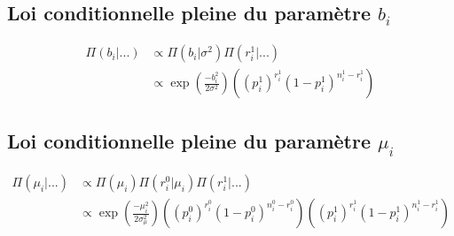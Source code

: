 \documentclass[
]{article}
\begin{document}
\hypertarget{loi-conditionnelle-pleine-du-paramuxe8tre-b_i}{%
\subsection{\texorpdfstring{Loi conditionnelle pleine du paramètre
\(b_i\)}{Loi conditionnelle pleine du paramètre b\_i}}\label{loi-conditionnelle-pleine-du-paramuxe8tre-b_i}}

\begin{align*}
\Pi(b_i|...) &\propto \Pi(b_i|\sigma^2) \Pi(r_i^1|...) \\
&\propto \exp\left({\frac{-b_i^2}{2\sigma^2}}\right) \left((p_i^1)^{r_i^1}(1-p_i^1)^{n_i^1-r_i^1}\right)
\end{align*}

\hypertarget{loi-conditionnelle-pleine-du-paramuxe8tre-mu_i}{%
\subsection{\texorpdfstring{Loi conditionnelle pleine du paramètre
\(\mu_i\)}{Loi conditionnelle pleine du paramètre \textbackslash mu\_i}}\label{loi-conditionnelle-pleine-du-paramuxe8tre-mu_i}}

\begin{align*}
\Pi(\mu_i|...) &\propto \Pi(\mu_i)\Pi(r_i^0|\mu_i)\Pi(r_i^1|...) \\
&\propto \exp\left({\frac{-\mu_i^2}{2\sigma_{\mu}^2}}\right)\left((p_i^0)^{r_i^0}(1-p_i^0)^{n_i^0-r_i^0}\right)\left((p_i^1)^{r_i^1}(1-p_i^1)^{n_i^1-r_i^1}\right)
\end{align*}
\end{document}
